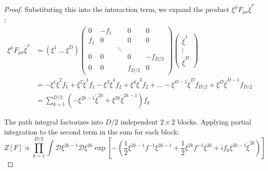 \begin{tcolorbox}[breakable]
\begin{proof}
			Substituting this into the interaction term, we expand the product $\xi^\mu F_{\mu\nu} \dot{\xi}^\nu$:
			\begin{align}
				\xi^\mu F_{\mu\nu} \dot{\xi}^\nu &= (\xi^1 \ \dots \ \xi^D) \begin{pmatrix} 
					0 & -f_1 & & 0 & 0 \\
					f_1 & 0 & & 0 & 0 \\
					& & \ddots & & \\
					0 & 0 & & 0 & -f_{D/2} \\
					0 & 0 & & f_{D/2} & 0 
				\end{pmatrix} \begin{pmatrix} \dot{\xi}^1 \\ \vdots \\ \dot{\xi}^D \end{pmatrix} \\
				&= -\xi^1 \dot{\xi}^2 f_1 + \xi^2 \dot{\xi}^1 f_1 - \xi^3 \dot{\xi}^4 f_2 + \xi^4 \dot{\xi}^3 f_2 + \dots - \xi^{D-1} \dot{\xi}^D f_{D/2} + \xi^D \dot{\xi}^{D-1} f_{D/2} \\
				&= \sum_{k=1}^{D/2} \left( -\xi^{2k-1} \dot{\xi}^{2k} + \xi^{2k} \dot{\xi}^{2k-1} \right) f_k 
			\end{align}
			
			The path integral factorizes into $D/2$ independent $2 \times 2$ blocks. Applying partial integration to the second term in the sum for each block:
			\begin{equation}
				Z[F] \propto \prod_{k=1}^{D/2} \int \mathcal{D}\xi^{2k-1} \mathcal{D}\xi^{2k} \exp \left[ -\left( \frac{1}{2} \xi^{2k-1} f^{-1} \xi^{2k-1} + \frac{1}{2} \xi^{2k} f^{-1} \xi^{2k} + i f_k \xi^{2k-1} \dot{\xi}^{2k} \right) \right]
			\end{equation}
			

\end{proof}
\end{tcolorbox}
